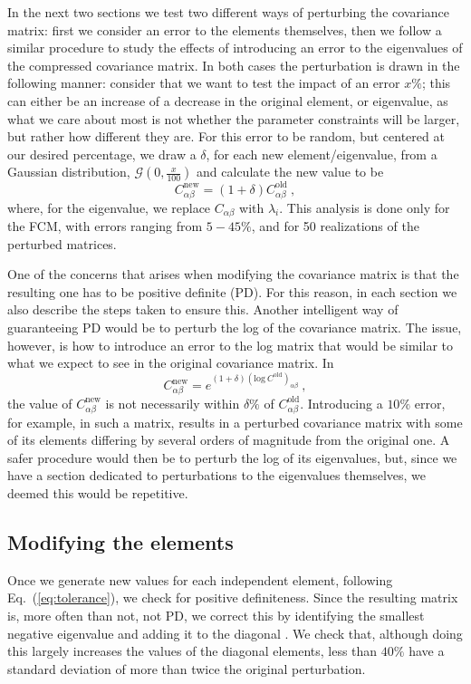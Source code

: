 \documentclass[aps, prd, twocolumn, superscriptaddress, nofootinbib, amssymb, amsmath]{revtex4-2}
\newcommand{\ec}[1]{Eq.~(\ref{eq:#1})}
\newcommand{\eql}[1]{\label{eq:#1}}
\newcommand\be{\begin{equation}}
\newcommand\ee{\end{equation}}
\newcommand\full{the FCM}
\begin{document}
In the next two sections we test two different ways of perturbing the covariance matrix: first we consider an error to the elements themselves, then we follow a similar procedure to study the effects of introducing an error to the eigenvalues of the compressed covariance matrix. In both cases the perturbation is drawn in the following manner: consider that we want to test the impact of an error $x \%$; this can either be an increase of a decrease in the original element, or eigenvalue, as what we care about most is not whether the parameter constraints will be larger, but rather how different they are. For this error to be random, but centered at our desired percentage, we draw a $\delta$, for each new element/eigenvalue, from a Gaussian distribution, $\mathcal{G}(0,\frac{x}{100})$ and calculate the new value to be
\be \eql{tolerance}
C_{\alpha \beta}^{\text{new}} = (1 + \delta)C_{\alpha \beta}^{\text{old}}\ 
,\ee
where, for the eigenvalue, we replace $C_{\alpha \beta}$ with $\lambda_i$. This analysis is done only for \full, with errors ranging from $5 - 45 \%$, and for 50 realizations of the perturbed matrices.

One of the concerns that arises when modifying the covariance matrix is that the resulting one has to be positive definite (PD). For this reason, in each section we also describe the steps taken to ensure this. Another intelligent way of guaranteeing PD would be to perturb the log of the covariance matrix. The issue, however, is how to introduce an error to the log matrix that would be similar to what we expect to see in the original covariance matrix. In
\be
C_{\alpha \beta}^{\text{new}} = e^{(1 + \delta)(\text{log}\ C^{\text{old}})_{\alpha \beta}}\ 
,\ee
the value of $C_{\alpha \beta}^{\text{new}}$ is not necessarily within $\delta \%$ of $C_{\alpha \beta}^{\text{old}}$. Introducing a $10\%$ error, for example, in such a matrix, results in a perturbed covariance matrix with some of its elements differing by several orders of magnitude from the original one. A safer procedure would then be to perturb the log of its eigenvalues, but, since we have a section dedicated to perturbations to the eigenvalues themselves, we deemed this would be repetitive.

\subsection{Modifying the elements}\label{subsec:tolerance_elements}

Once we generate new values for each independent element, following \ec{tolerance}, we check for positive definiteness. Since the resulting matrix is, more often than not, not PD, we correct this by identifying the smallest negative eigenvalue and adding it to the diagonal \cite{Yuan:2008}. We check that, although doing this largely increases the values of the diagonal elements, less than $40 \%$ have a standard deviation of more than twice the original perturbation. 
\end{document}
